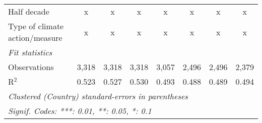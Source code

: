 \begin{table}[htbp]
\begin{tabular}{lccccccc}
      Half decade                                                                       & x            & x            & x             & x             & x              & x              & x\\  
      Type of climate action/measure                                                    & x            & x            & x             & x             & x              & x              & x\\  
      \midrule \emph{Fit statistics}\\
      Observations                                                                      & 3,318        & 3,318        & 3,318         & 3,057         & 2,496          & 2,496          & 2,379\\  
      R$^2$                                                                             & 0.523        & 0.527        & 0.530         & 0.493         & 0.488          & 0.489          & 0.494\\  
      \midrule
      \multicolumn{8}{l}{\emph{Clustered (Country) standard-errors in parentheses}}\\
      \multicolumn{8}{l}{\emph{Signif. Codes: ***: 0.01, **: 0.05, *: 0.1}}\\
   \end{tabular}
\end{table}


